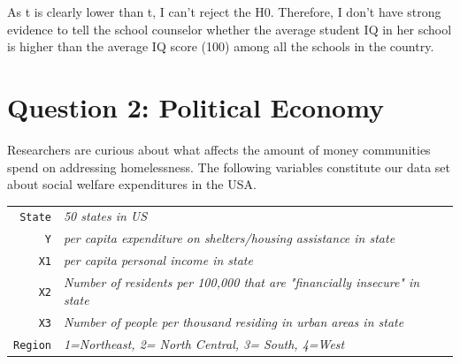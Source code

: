 \documentclass[12pt,letterpaper]{article}
\begin{document}
		 

As t is clearly lower than t, I can't reject the H0. Therefore, I don't have strong evidence to tell the school counselor whether the average student IQ in her school is higher than the average IQ score (100) among all the schools in the country.

\newpage

	\section*{Question 2: Political Economy}

\noindent Researchers are curious about what affects the amount of money communities spend on addressing homelessness. The following variables constitute our data set about social welfare expenditures in the USA. \\
\vspace{.5cm}

\begin{tabular}{r|l}
	\texttt{State} &\emph{50 states in US} \\
	\texttt{Y} & \emph{per capita expenditure on shelters/housing assistance in state}\\
	\texttt{X1} &\emph{per capita personal income in state} \\
	\texttt{X2} &  \emph{Number of residents per 100,000 that are "financially insecure" in state}\\
	\texttt{X3} &  \emph{Number of people per thousand residing in urban areas in state} \\
	\texttt{Region} &  \emph{1=Northeast, 2= North Central, 3= South, 4=West} \\
\end{tabular}
\end{document}
